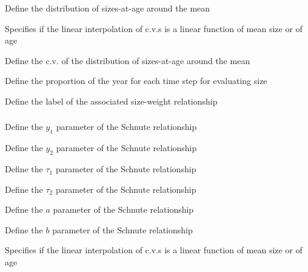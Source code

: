  {Define the distribution of sizes-at-age around the mean}

 {Specifies if the linear interpolation of c.v.s is a linear function of mean size or of age}

 {Define the c.v. of the distribution of sizes-at-age around the mean}

 {Define the proportion of the year for each time step for evaluating size}

 {Define the label of the associated size-weight relationship}

\subsubsection[Schnute]{}

 {Define the $y_1$ parameter of the Schnute relationship}

 {Define the $y_2$ parameter of the Schnute relationship}

 {Define the $\tau_1$ parameter of the Schnute relationship}

 {Define the $\tau_2$ parameter of the Schnute relationship}

 {Define the $a$ parameter of the Schnute relationship}

 {Define the $b$ parameter of the Schnute relationship}

 {Specifies if the linear interpolation of c.v.s is a linear function of mean size or of age}

